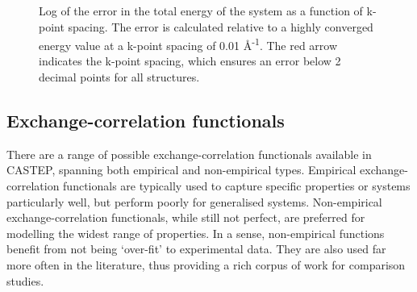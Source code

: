 \begin{figure}[ht]
\begin{center}
		\caption{Log of the error in the total energy of the system as a function of k-point spacing. The error is calculated relative to a highly converged energy value at a k-point spacing of 0.01 \r{A}\textsuperscript{-1}. The red arrow indicates the k-point spacing, which ensures an error below 2 decimal points for all structures.}
		\label{Figure:kpoint_convergence}
	\end{center}
\end{figure}

\subsection{Exchange-correlation functionals}

There are a range of possible exchange-correlation functionals available in CASTEP, spanning both empirical and non-empirical types. Empirical exchange-correlation functionals are typically used to capture specific properties or systems particularly well, but perform poorly for generalised systems. Non-empirical exchange-correlation functionals, while still not perfect, are preferred for modelling the widest range of properties. In a sense, non-empirical functions benefit from not being `over-fit' to experimental data. They are also used far more often in the literature, thus providing a rich corpus of work for comparison studies.

